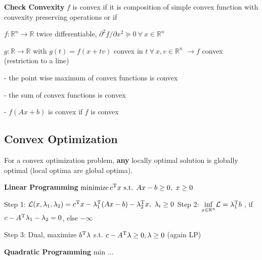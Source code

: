 \textbf{Check Convexity} $f$ is convex if it is
composition of simple convex function
with convexity preserving operations
or if


$f: \mathbb{R}^n \rightarrow \mathbb{R}$ twice differentiable,
$\partial^2f/\partial x^2 \succeq 0\ \forall\ x \in \mathbb{R}^{n}$

$g: \mathbb{R} \rightarrow \mathbb{R}$ with $g(t)=f(x+tv)$
convex in $t\ \forall\ x,v \in \mathbb{R}^{n}$
$\rightarrow f$ convex (restriction to a line)


- the point wise maximum of convex functions is convex

- the sum of convex functions is convex

- $f(Ax+b)$ is convex if $f$ is convex



\subsection{Convex Optimization}


\begin{theorem}
	For a convex optimization problem,
	\textbf{any} locally optimal solution is globally
	optimal (local optima are global optima).
\end{theorem}



\textbf{Linear Programming}
$ \operatorname{minimize} c^\textnormal{\scriptsize T} x
	\text{ s.t. } Ax-b \ge 0,\ x\ge0$

Step 1:
$\mathcal{L}(x,\lambda_1,\lambda_2) =
	c^\textnormal{\scriptsize T} x-\lambda_1^\textnormal{\scriptsize T} (Ax-b) -\lambda_2^\textnormal{\scriptsize T} x,\ \lambda_i \ge0$
Step 2:
$\underset{x \in \mathcal{\mathbb{R}}^n}{\operatorname{inf}}
	\mathcal{L}=\lambda_1^\textnormal{\scriptsize T} b$
, if $c-A^\textnormal{\scriptsize T}\lambda_1-\lambda_2=0$, else $-\infty$

Step 3: Dual,
maximize $b^\textnormal{\scriptsize T}\lambda$
s.t.
$c-A^\textnormal{\scriptsize T}\lambda\ge0,\lambda\ge0$
(again LP)

\textbf{Quadratic Programming}
min ...
